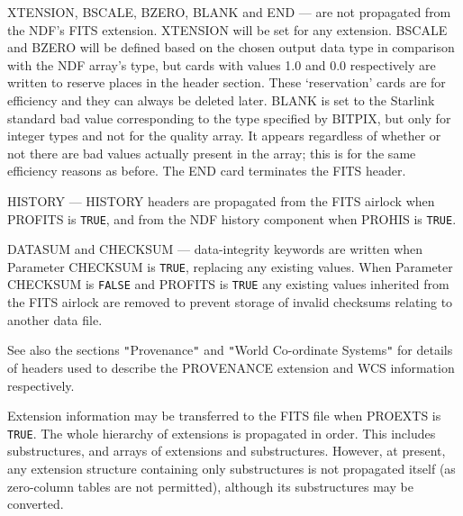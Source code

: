 \documentclass[twoside,11pt]{article}
\newcommand{\htmlref}[2]{#1}
\newcommand{\xref}[3]{#1}
\newcommand{\sstitem}{\item}
\newcommand{\sstitem}{\item}
\begin{document}
{{{{            \sstitem
            XTENSION, BSCALE, BZERO, BLANK and END --- are not propagated
              from the NDF's FITS extension.  XTENSION will be set for
              any extension.  BSCALE and BZERO will be defined based on
              the chosen output data type in comparison with the NDF
              array's type, but cards with values 1.0 and 0.0 respectively
              are written to reserve places in the header section.  These
              `reservation' cards are for efficiency and they can always
              be deleted later.  BLANK is set to the Starlink standard 
              \xref{bad value}{sun95}{se_badmasking} corresponding to the type
              specified by BITPIX, but only for integer types and not for the
              quality array.  It appears regardless of whether or not there are
              bad values actually present in the array; this is for the same
              efficiency reasons as before.  The END card terminates the FITS header.

            \sstitem
            HISTORY --- HISTORY headers are propagated from the FITS
              airlock when PROFITS is \texttt{TRUE}, and from the NDF
              history component when PROHIS is \texttt{TRUE}.

            \sstitem
            DATASUM and CHECKSUM --- data-integrity keywords are written 
            when Parameter CHECKSUM is \texttt{TRUE}, replacing any existing
            values.  When Parameter CHECKSUM is \texttt{FALSE} and PROFITS is
            \texttt{TRUE} any existing values inherited from the FITS airlock are 
            removed to prevent storage of invalid checksums relating to 
            another data file.

         }
         See also the sections
         \htmlref{\texttt{"}Provenance\texttt{"}}{ndf2fits_provenance} and
         \htmlref{\texttt{"}World Co-ordinate Systems\texttt{"}}{world_coordinate_systems}
         for details of headers used to describe the PROVENANCE extension 
         and WCS information respectively.

         \sstitem
         Extension information may be transferred to the FITS file when
         PROEXTS is \texttt{TRUE}.
         The whole hierarchy of extensions is propagated
         in order.  This includes substructures, and arrays of extensions
         and substructures.  However, at present, any extension structure
         containing only substructures is not propagated itself (as
         zero-column tables are not permitted), although its
         substructures may be converted.
 
}}}
\end{document}
